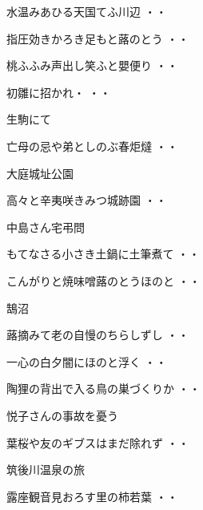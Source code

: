 \begin{shiika}水温みあひる天国てふ川辺
\hfill{・・}\end{shiika}
\begin{shiika}指圧効きかろき足もと蕗のとう
\hfill{・・}\end{shiika}
\begin{shiika}桃ふふみ声出し笑ふと嬰便り
\hfill{・・}\end{shiika}
\begin{shiika}初雛に招かれ・
\hfill{・・}\end{shiika}
\vspace{0.4cm}
生駒にて
\begin{shiika}亡母の忌や弟としのぶ春炬燵
\hfill{・・}\end{shiika}
\vspace{0.4cm}
大庭城址公園
\begin{shiika}高々と辛夷咲きみつ城跡園
\hfill{・・}\end{shiika}
\vspace{0.4cm}
中島さん宅弔問
\begin{shiika}もてなさる小さき土鍋に土筆煮て
\hfill{・・}\end{shiika}
\begin{shiika}こんがりと焼味噌蕗のとうほのと
\hfill{・・}\end{shiika}
\vspace{0.4cm}
鵠沼
\begin{shiika}蕗摘みて老の自慢のちらしずし
\hfill{・・}\end{shiika}
\begin{shiika}一心の白夕闇にほのと浮く
\hfill{・・}\end{shiika}
\begin{shiika}陶狸の背出で入る鳥の巣づくりか
\hfill{・・}\end{shiika}
\vspace{0.4cm}
悦子さんの事故を憂う
\begin{shiika}葉桜や友のギブスはまだ除れず
\hfill{・・}\end{shiika}
\vspace{0.4cm}
筑後川温泉の旅
\begin{shiika}露座観音見おろす里の柿若葉
\hfill{・・}\end{shiika}
